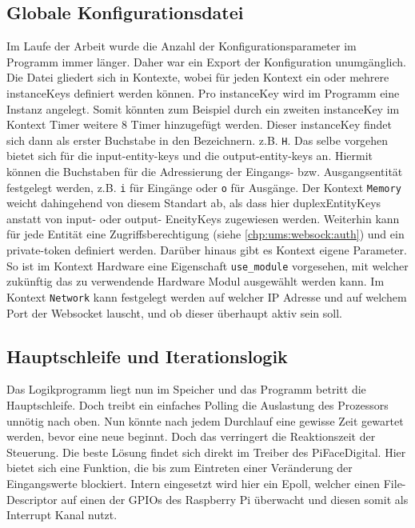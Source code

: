 \subsection{Globale Konfigurationsdatei}
Im Laufe der Arbeit wurde die Anzahl der Konfigurationsparameter im Programm immer länger. Daher war ein Export der Konfiguration unumgänglich. Die Datei gliedert sich in Kontexte, wobei für jeden Kontext ein oder mehrere instanceKeys definiert werden können. Pro instanceKey wird im Programm eine Instanz angelegt. Somit könnten zum Beispiel durch ein zweiten instanceKey im Kontext Timer weitere 8 Timer hinzugefügt werden. Dieser instanceKey  findet sich dann als erster Buchstabe in den Bezeichnern. z.B. \texttt{H}. Das selbe vorgehen bietet sich für die input-entity-keys und die output-entity-keys an. Hiermit können die Buchstaben für die Adressierung der Eingangs- bzw. Ausgangsentität festgelegt werden, z.B. \texttt{i} für Eingänge oder \texttt{o} für Ausgänge. Der Kontext \texttt{Memory} weicht dahingehend von diesem Standart ab, als dass hier duplexEntityKeys anstatt von input- oder output- EneityKeys zugewiesen werden. Weiterhin kann für jede Entität eine Zugriffsberechtigung (siehe \autoref{chp:ums:websock:auth}) und ein private-token definiert werden. Darüber hinaus gibt es Kontext eigene Parameter. So ist im Kontext Hardware eine Eigenschaft \texttt{use\_module} vorgesehen, mit welcher zukünftig das zu verwendende Hardware Modul ausgewählt werden kann. Im Kontext \texttt{Network} kann festgelegt werden auf welcher IP Adresse und auf welchem Port der Websocket lauscht, und ob dieser überhaupt aktiv sein soll. 

\subsection{Hauptschleife und Iterationslogik}\label{kap:ums:mainloop}
Das Logikprogramm liegt nun im Speicher und das Programm betritt die Hauptschleife. Doch treibt ein einfaches Polling die Auslastung des Prozessors unnötig nach oben. Nun könnte nach jedem Durchlauf eine gewisse Zeit gewartet werden, bevor eine neue beginnt. Doch das verringert die Reaktionszeit der Steuerung. Die beste Lösung findet sich direkt im Treiber des PiFaceDigital. Hier bietet sich eine Funktion, die bis zum Eintreten einer Veränderung der  Eingangswerte blockiert. Intern eingesetzt wird hier ein Epoll, welcher einen File-Descriptor auf einen der GPIOs des Raspberry Pi überwacht und diesen somit als Interrupt Kanal nutzt.  


